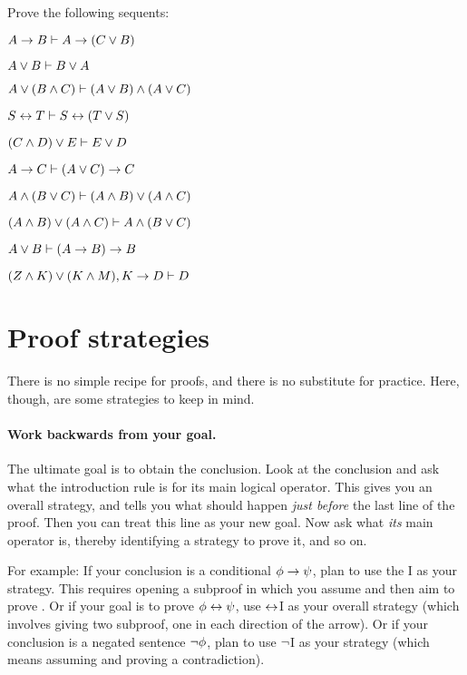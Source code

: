 \practiceproblems

\problempart
Prove the following sequents:

\begin{earg}

\item $A \rightarrow B \vdash A \rightarrow (C \vee B)$
\item $A \vee B \vdash B \vee A$
\item $A \vee (B \wedge C) \vdash (A \vee B) \wedge (A \vee C)$
\item $S\leftrightarrow T \vdash S\leftrightarrow (T\vee S)$
\item $(C\wedge D)\vee E \vdash E\vee D$
\item $A \rightarrow C \vdash (A \vee C) \rightarrow C$
\item $ A \wedge (B \vee C) \vdash (A \wedge B) \vee (A \wedge C)$
\item $  (A \wedge B) \vee (A \wedge C) \vdash  A \wedge (B \vee C)$
\item $A \vee B \vdash (A \rightarrow B) \rightarrow B$
\item $(Z\wedge K) \vee (K\wedge M), K \rightarrow D \vdash D$
\end{earg}



\section{Proof strategies}\label{s:ProofStrategies}
There is no simple recipe for proofs, and there is no substitute for practice. Here, though, are some strategies to keep in mind.

\paragraph{Work backwards from your goal.}
The ultimate goal is to obtain the conclusion. Look at the conclusion and ask what the introduction rule is for its main logical operator. This gives you an overall strategy, and tells you what should happen \emph{just before} the last line of the proof. Then you can treat this line as your new goal. Now ask what \emph{its} main operator is, thereby identifying a strategy to prove it, and so on.


For example: If your conclusion is a conditional $\mathcal{\phi}\rightarrow\mathcal{\psi}$, plan to use the {\eif}I as your strategy. This requires opening a subproof in which you assume \meta{\phi} and then aim to prove \meta{\psi}.  Or if your goal is to prove $\mathcal{\phi} \leftrightarrow \mathcal{\psi}$, use $\leftrightarrow$I as your overall strategy (which involves giving two subproof, one in each direction of the arrow). Or if your conclusion is a negated sentence $\neg \mathcal{\phi}$, plan to use $\neg$I as your strategy (which means assuming \meta{\phi} and proving a contradiction).


